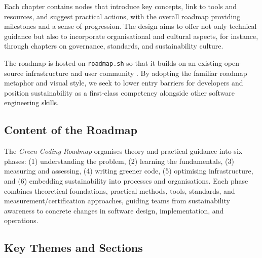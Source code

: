 \documentclass[english]{lni}
\begin{document}
Each chapter contains nodes that introduce key concepts, link to tools and resources, and suggest practical actions, with the overall roadmap providing milestones and a sense of progression. The design aims to offer not only technical guidance but also to incorporate organisational and cultural aspects, for instance, through chapters on governance, standards, and sustainability culture.

The roadmap is hosted on \texttt{roadmap.sh} so that it builds on an existing open-source infrastructure and user community \cite{junger_2026_workshop}. By adopting the familiar roadmap metaphor and visual style, we seek to lower entry barriers for developers and position sustainability as a first-class competency alongside other software engineering skills.


\subsection{Content of the Roadmap}

The \textit{Green Coding Roadmap} organises theory and practical guidance into six phases: (1) understanding the problem, (2) learning the fundamentals, (3) measuring and assessing, (4) writing greener code, (5) optimising infrastructure, and (6) embedding sustainability into processes and organisations. Each phase combines theoretical foundations, practical methods, tools, standards, and measurement/certification approaches, guiding teams from sustainability awareness to concrete changes in software design, implementation, and operations.


\subsection{Key Themes and Sections}
\end{document}
